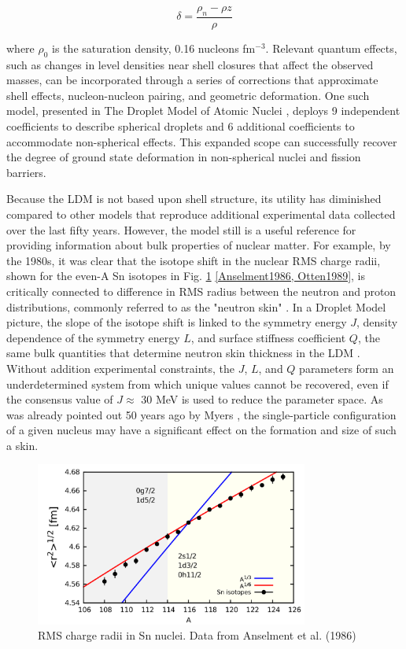 \begin{equation}
    \delta = \frac{\rho_{n}-\rho{z}}{\rho}
\end{equation}

where $\rho_{0}$ is the saturation density, 0.16 nucleons fm$^{-3}$. Relevant quantum
effects, such as changes in level densities near shell closures
that affect the observed masses, can be incorporated through a series of corrections
that approximate shell effects, nucleon-nucleon pairing, and geometric deformation.
One such model, presented in The Droplet Model of Atomic Nuclei
\cite{MyersAndSwiatecki}, deploys 9 
independent coefficients to describe spherical droplets and 6 additional
coefficients to accommodate non-spherical effects. This expanded scope
can successfully recover the degree of ground state deformation in non-spherical
nuclei and fission barriers.

Because the LDM is not based upon shell structure, its utility has diminished
compared to other models that reproduce additional experimental data collected
over the last fifty years. However, the model still is a useful reference for providing 
information about bulk properties of nuclear matter. For example, by the 1980s,
it was clear that the isotope shift in the nuclear RMS
charge radii, shown for the even-A Sn isotopes in Fig.
\ref{SnIsotopeShift} \ref{Anselment1986, Otten1989},
is critically connected to difference in RMS radius 
between the neutron and proton distributions, commonly referred to as the
"neutron skin" \cite{Wilkinson1967}.
In a Droplet Model picture, the slope of the isotope shift is linked to the symmetry energy $J$, 
density dependence of the symmetry energy
$L$, and surface stiffness coefficient $Q$, the same bulk quantities that determine
neutron skin thickness in the LDM \cite{Myers1969, MyersAndSwiatecki, Berdichevsky1988}.
Without addition experimental constraints, the $J$, $L$, and $Q$ parameters form an
underdetermined system from which unique values cannot be recovered, even if the
consensus value of $J \approx$ 30 MeV is used to reduce the parameter space.
As was already pointed out 50 years ago by Myers \cite{Myers1969},
the single-particle configuration of a given nucleus may have a significant
effect on the formation and size of such a skin.

\begin{figure}
    \includegraphics[width=0.8\textwidth]{figures/SnIsotopeRMSRadii.png}
    \caption{RMS charge radii in Sn nuclei. Data from Anselment et al. (1986)}
    \label{SnIsotopeShift}
\end{figure}


